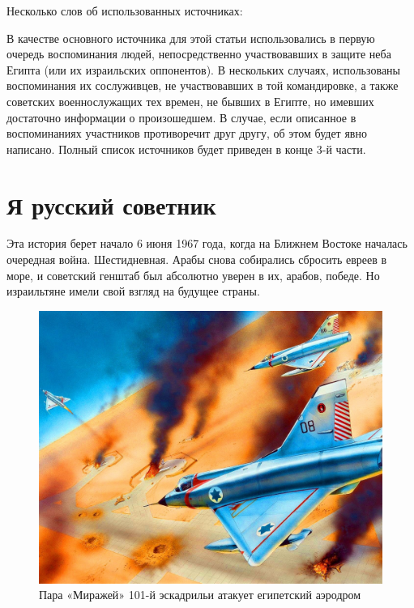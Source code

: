 Несколько слов об использованных источниках:

В качестве основного источника для этой статьи использовались в первую очередь воспоминания людей, непосредственно участвовавших в защите неба Египта (или их израильских оппонентов). В нескольких случаях, использованы воспоминания их сослуживцев, не участвовавших в той командировке, а также советских военнослужащих тех времен, не бывших в Египте, но имевших достаточно информации о произошедшем. В случае, если описанное в воспоминаниях участников противоречит друг другу, об этом будет явно написано. Полный список источников будет приведен в конце 3-й части.

\section{Я русский советник}

Эта история берет начало 6 июня 1967 года, когда на Ближнем Востоке началась очередная война. Шестидневная. Арабы снова собирались сбросить евреев в море, и советский генштаб был абсолютно уверен в их, арабов, победе. Но израильтяне имели свой взгляд на будущее страны.

\begin{figure}[h!tb] 
	\centering\includegraphics[scale=0.4]{Dolina_1/3bsutm8WQ9I.jpg}
	\caption{Пара «Миражей» 101-й эскадрильи атакует египетский аэродром}%
\end{figure}

